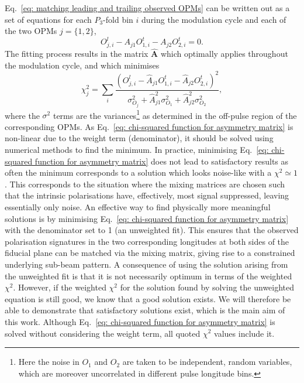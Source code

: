 Eq.~\eqref{eq: matching leading and trailing observed OPMs} can be written out as a set of equations for each $P_3$-fold bin $i$ during the modulation cycle and each of the two OPMs $j = \{1,2\}$,
\begin{equation}
    \label{eq: matched observed OPMs - simultaneous equations}
    O_{j,i}^l - A_{j1}O_{1,i}^t - A_{j2}O_{2,i}^t = 0.
\end{equation}
The fitting process results in the matrix $\mathbf{\hat{A}}$ which optimally applies throughout the modulation cycle, and which minimises
\begin{equation}
    \label{eq: chi-squared function for asymmetry matrix}
    \chi_j^2 = \sum_i{\frac{(O_{j,i}^l - \hat{A}_{j1}O_{1,i}^t - \hat{A}_{j2}O_{2,i}^t)^2}{\sigma_{O_j}^2 + \hat{A}_{j1}^2\sigma_{O_1}^2 + \hat{A}_{j2}^2\sigma_{O_2}^2 }},
\end{equation}
where the $\sigma^2$ terms are the variances\footnote{Here the noise in $O_1$ and $O_2$ are taken to be independent, random variables, which are moreover uncorrelated in different pulse longitude bins.} as determined in the off-pulse region of the corresponding OPMs. As Eq.~\eqref{eq: chi-squared function for asymmetry matrix} is non-linear due to the weight term (denominator), it should be solved using numerical methods to find the minimum. In practice, minimising Eq.~\ref{eq: chi-squared function for asymmetry matrix} does not lead to satisfactory results as often the minimum corresponds to a solution which looks noise-like with a $\chi^2 \simeq 1$. This corresponds to the situation where the mixing matrices are chosen such that the intrinsic polarisations have, effectively, most signal suppressed, leaving essentially only noise. An effective way to find physically more meaningful solutions is by minimising Eq.~\ref{eq: chi-squared function for asymmetry matrix} with the denominator set to 1 (an unweighted fit). This ensures that the observed polarisation signatures in the two corresponding longitudes at both sides of the fiducial plane can be matched via the mixing matrix, giving rise to a constrained underlying sub-beam pattern. A consequence of using the solution arising from the unweighted fit is that it is not necessarily optimum in terms of the weighted $\chi^2$. However, if the weighted $\chi^2$ for the solution found by solving the unweighted equation is still good, we know that a good solution exists. We will therefore be able to demonstrate that satisfactory solutions exist, which is the main aim of this work. Although Eq.~\eqref{eq: chi-squared function for asymmetry matrix} is solved without considering the weight term, all quoted $\chi^2$ values include it.


